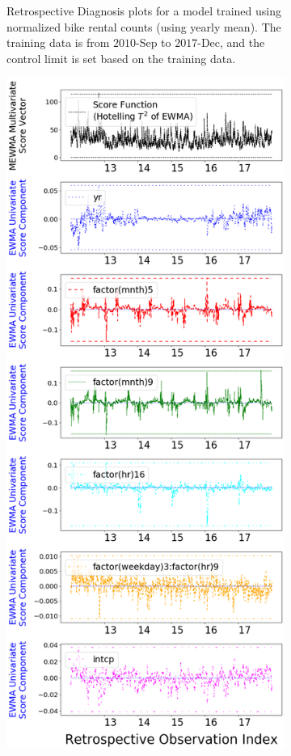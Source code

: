 \documentclass[twoside,11pt]{article}
\begin{document}
\begin{enumerate}
\begin{figure}[H]
\begin{subfigure}[t]{0.32\linewidth}
     \captionsetup{width=.95\linewidth}
     \caption{Retrospective Diagnosis plots for a model trained using normalized bike rental counts (using yearly mean). The training data is from $2010$-Sep to $2017$-Dec, and the control limit is set based on the training data.}
     \label{fig:bs_raw_cnt}
\end{subfigure}
\begin{subfigure}[t]{0.32\linewidth}
     \centering
         \includegraphics[width=1.0\textwidth, trim=.0in .0in .0in .0in, clip]{../figures/v14/bike_sharing/reg_lin_C_1/PII_pos_single_retro_bike_fisher_mlines_with_regu_1e-08_0_0001_0_01_99_99.png}

\end{subfigure}
\end{figure}
\end{enumerate}
\end{document}
